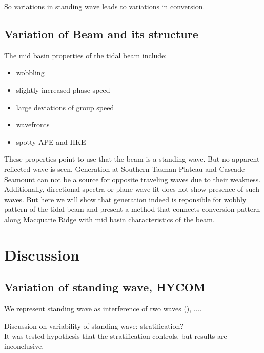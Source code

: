 So variations in standing wave leads to variations in conversion.\\

\subsection{Variation of Beam and its structure}
The mid basin properties of the tidal beam include:
\begin{itemize}
\item wobbling
\item slightly increased phase speed
\item large deviations of group speed
\item wavefronts
\item spotty APE and HKE
\end{itemize}
\begin{figure}
\end{figure}
These properties point to use that the beam is a standing wave. But no apparent reflected wave is seen. Generation at Southern Tasman Plateau and Cascade Seamount can not be a source for opposite traveling waves due to their weakness. Additionally, directional spectra or plane wave fit does not show presence of such waves. But here we will show that generation indeed is reponsible for wobbly pattern of the tidal beam and present a method that connects conversion pattern along Macquarie Ridge with mid basin characteristics of the beam.

\section{Discussion}
\subsection{Variation of standing wave, HYCOM}
We represent standing wave as interference of  two waves (\cite{martini2007diagnosing}),
....\\
\begin{figure}
\end{figure}

\begin{figure}
\end{figure}
Discussion on variability of standing wave: stratification?\\
It was tested hypothesis that the stratification controls, but results are inconclusive.\\

